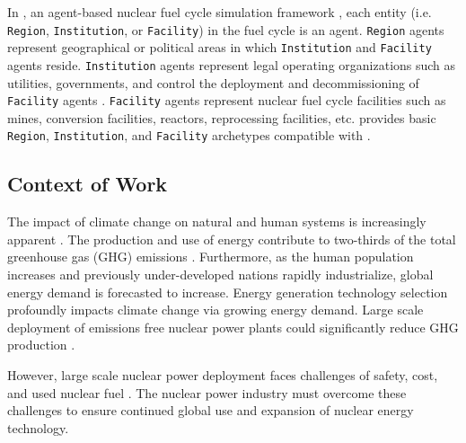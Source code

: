In \Cyclus, an agent-based nuclear fuel cycle simulation framework 
\cite{huff_fundamental_2016}, 
each entity (i.e. \texttt{Region}, \texttt{Institution}, or \texttt{Facility}) in the 
fuel cycle is an agent. 
\texttt{Region} agents represent geographical or political areas in which \texttt{Institution}
and \texttt{Facility} agents reside. 
\texttt{Institution} agents represent legal operating organizations such as
utilities, governments, and control the 
deployment and decommissioning of \texttt{Facility} agents
\cite{huff_fundamental_2016}.
\texttt{Facility} agents represent nuclear fuel cycle facilities
such as mines, conversion facilities, reactors, reprocessing facilities, 
etc. 
\Cycamore \cite{carlsen_cycamore_2014}
provides basic \texttt{Region}, \texttt{Institution}, 
and \texttt{Facility} archetypes compatible with \Cyclus. 

\subsection{Context of Work}
The impact of climate change on natural and human systems 
is increasingly apparent \cite{noauthor_climate_2018}.
The production and use of energy contribute to 
two-thirds of the total greenhouse gas (GHG) 
emissions \cite{noauthor_climate_2018}.
Furthermore, as the human population increases and previously 
under-developed nations rapidly industrialize, 
global energy demand is forecasted to increase. 
Energy generation technology selection 
profoundly impacts climate change via growing energy demand. 
Large scale deployment of emissions free nuclear power plants 
could significantly reduce GHG production 
\cite{noauthor_climate_2018}.    

However, large scale nuclear power deployment faces
challenges of safety, cost, and used nuclear fuel  
\cite{petti_future_2018}. 
The nuclear power industry must overcome these challenges 
to ensure continued global use and expansion 
of nuclear energy technology. 

